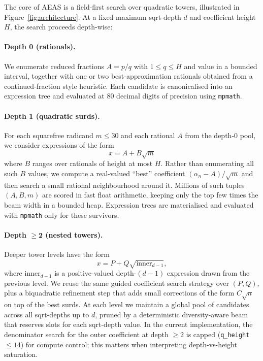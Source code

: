 \documentclass[11pt]{article}
\begin{document}
The core of AEAS is a field-first search over quadratic towers, illustrated in Figure~\ref{fig:architecture}.
At a fixed maximum sqrt-depth $d$ and coefficient height $H$, the search proceeds depth-wise:

\paragraph{Depth 0 (rationals).}
We enumerate reduced fractions $A = p/q$ with $1 \le q \le H$ and value in a bounded interval, together with one or two best-approximation rationals obtained from a continued-fraction style heuristic.
Each candidate is canonicalised into an expression tree and evaluated at $80$ decimal digits of precision using \texttt{mpmath}.

\paragraph{Depth 1 (quadratic surds).}
For each squarefree radicand $m \le 30$ and each rational $A$ from the depth-0 pool, we consider expressions of the form
\[
  x = A + B\sqrt{m}
\]
where $B$ ranges over rationals of height at most $H$.
Rather than enumerating all such $B$ values, we compute a real-valued ``best'' coefficient $(\alpha_n - A)/\sqrt{m}$ and then search a small rational neighbourhood around it.
Millions of such tuples $(A,B,m)$ are scored in fast float arithmetic, keeping only the top few times the beam width in a bounded heap.
Expression trees are materialised and evaluated with \texttt{mpmath} only for these survivors.

\paragraph{Depth $\bm{\ge 2}$ (nested towers).}
Deeper tower levels have the form
\[
  x = P + Q\sqrt{\text{inner}_{d-1}},
\]
where $\text{inner}_{d-1}$ is a positive-valued depth-$(d-1)$ expression drawn from the previous level.
We reuse the same guided coefficient search strategy over $(P,Q)$, plus a biquadratic refinement step that adds small corrections of the form $C\sqrt{n}$ on top of the best surds.
At each level we maintain a global pool of candidates across all sqrt-depths up to $d$, pruned by a deterministic diversity-aware beam that reserves slots for each sqrt-depth value.
In the current implementation, the denominator search for the outer coefficient at depth $\ge 2$ is capped (\texttt{q\_height} $\le 14$) for compute control; this matters when interpreting depth-vs-height saturation.
\end{document}
